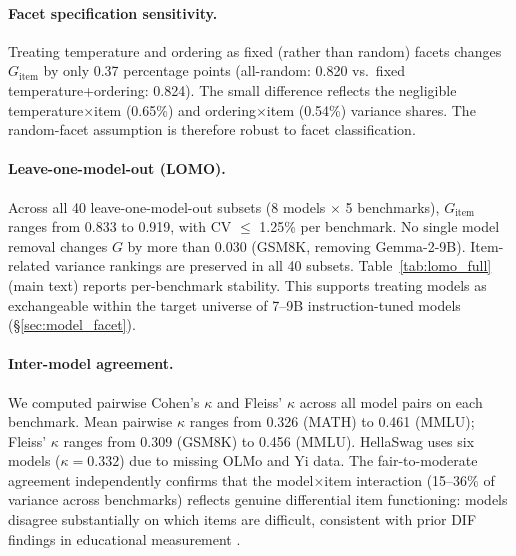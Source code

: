 \paragraph{Facet specification sensitivity.} Treating temperature and ordering as fixed (rather than random) facets changes $G_\text{item}$ by only 0.37 percentage points (all-random: 0.820 vs.\ fixed temperature+ordering: 0.824). The small difference reflects the negligible temperature$\times$item (0.65\%) and ordering$\times$item (0.54\%) variance shares. The random-facet assumption is therefore robust to facet classification.

\paragraph{Leave-one-model-out (LOMO).} Across all 40 leave-one-model-out subsets (8 models $\times$ 5 benchmarks), $G_\text{item}$ ranges from 0.833 to 0.919, with CV $\leq$ 1.25\% per benchmark. No single model removal changes $G$ by more than 0.030 (GSM8K, removing Gemma-2-9B). Item-related variance rankings are preserved in all 40 subsets. Table~\ref{tab:lomo_full} (main text) reports per-benchmark stability. This supports treating models as exchangeable within the target universe of 7--9B instruction-tuned models (\S\ref{sec:model_facet}).

\paragraph{Inter-model agreement.} We computed pairwise Cohen's $\kappa$ and Fleiss' $\kappa$ across all model pairs on each benchmark. Mean pairwise $\kappa$ ranges from 0.326 (MATH) to 0.461 (MMLU); Fleiss' $\kappa$ ranges from 0.309 (GSM8K) to 0.456 (MMLU). HellaSwag uses six models ($\kappa = 0.332$) due to missing OLMo and Yi data. The fair-to-moderate agreement independently confirms that the model$\times$item interaction (15--36\% of variance across benchmarks) reflects genuine differential item functioning: models disagree substantially on which items are difficult, consistent with prior DIF findings in educational measurement \cite{holland1993dif, clauser1998dif}.

